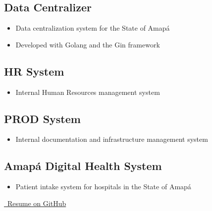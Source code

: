 \documentclass{article}
\begin{document}
\subsection{Data Centralizer}
\begin{itemize}
  \item Data centralization system for the State of Amapá
  \item Developed with Golang and the Gin framework
\end{itemize}

\subsection{HR System}
\begin{itemize}
  \item Internal Human Resources management system
\end{itemize}

\subsection{PROD System}
\begin{itemize}
  \item Internal documentation and infrastructure management system
\end{itemize}

\subsection{Amapá Digital Health System}
\begin{itemize}
  \item Patient intake system for hospitals in the State of Amapá
\end{itemize}

\href{https://github.com/PedroPaulo-98/Curriculo}{\faGithub\ Resume on GitHub}
\end{document}
